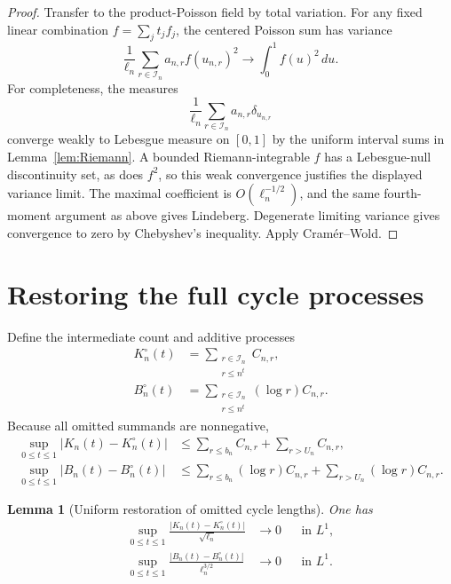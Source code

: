 \documentclass[11pt]{article}
\newtheorem{lemma}[theorem]{Lemma}
\theoremstyle{definition}
\theoremstyle{remark}
\newcommand{\dd}{\,d}
\newcommand{\cI}{\mathcal I}
\begin{document}
\begin{proof}
Transfer to the product-Poisson field by total variation.  For any fixed
linear combination $f=\sum_jt_jf_j$, the centered Poisson sum has variance
\[
 \frac1{\ell_n}\sum_{r\in\cI_n}a_{n,r}f(u_{n,r})^2
 \longrightarrow\int_0^1f(u)^2\dd u.
\]
For completeness, the measures
\[
 \frac1{\ell_n}\sum_{r\in\cI_n}a_{n,r}\delta_{u_{n,r}}
\]
converge weakly to Lebesgue measure on $[0,1]$ by the uniform interval
sums in Lemma~\ref{lem:Riemann}. A bounded Riemann-integrable $f$ has a
Lebesgue-null discontinuity set, as does $f^2$, so this weak convergence
justifies the displayed variance limit. The maximal coefficient is
$O(\ell_n^{-1/2})$, and the same fourth-moment argument as above gives
Lindeberg. Degenerate limiting variance gives convergence to zero by
Chebyshev's inequality. Apply Cram\'er--Wold.
\end{proof}

\section{Restoring the full cycle processes}

Define the intermediate count and additive processes
\begin{align}
 K_n^\circ(t)&=\sum_{\substack{r\in\cI_n\\r\le n^t}}C_{n,r},
 \label{eq:Kcirc}\\
 B_n^\circ(t)&=\sum_{\substack{r\in\cI_n\\r\le n^t}}(\log r)C_{n,r}.
 \label{eq:Bcirc-process}
\end{align}
Because all omitted summands are nonnegative,
\begin{align}
 \sup_{0\le t\le1}|K_n(t)-K_n^\circ(t)|
 &\le\sum_{r\le b_n}C_{n,r}+\sum_{r>U_n}C_{n,r},
 \label{eq:K-uniform-omit}\\
 \sup_{0\le t\le1}|B_n(t)-B_n^\circ(t)|
 &\le\sum_{r\le b_n}(\log r)C_{n,r}
 +\sum_{r>U_n}(\log r)C_{n,r}.
 \label{eq:B-uniform-omit}
\end{align}

\begin{lemma}[Uniform restoration of omitted cycle lengths]
\label{lem:restore}
One has
\begin{align}
 \sup_{0\le t\le1}
 \frac{|K_n(t)-K_n^\circ(t)|}{\sqrt{\ell_n}}
 &\longrightarrow0
 &&\text{in }L^1,
 \label{eq:restore-K}\\
 \sup_{0\le t\le1}
 \frac{|B_n(t)-B_n^\circ(t)|}{\ell_n^{3/2}}
 &\longrightarrow0
 &&\text{in }L^1.
 \label{eq:restore-B}
\end{align}
\end{lemma}
\end{document}
